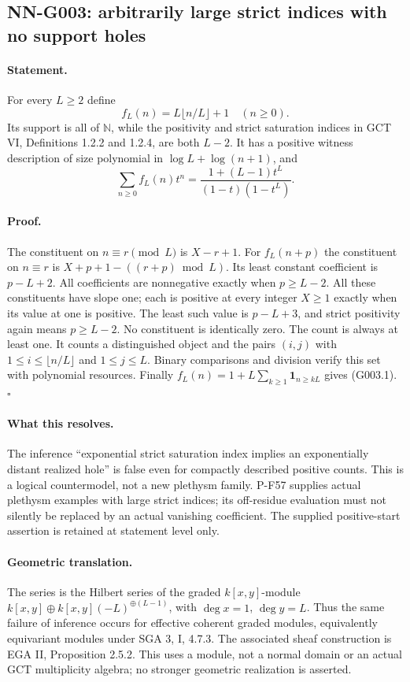 \subsection{NN-G003: arbitrarily large strict indices with no support holes}
\paragraph{Statement.}
For every $L\ge2$ define
\[
 f_L(n)=L\lfloor n/L\rfloor+1\quad(n\ge0).
\]
Its support is all of $\mathbb N$, while the positivity and strict
saturation indices in GCT VI, Definitions 1.2.2 and 1.2.4, are both
$L-2$. It has a positive witness description of size polynomial in
$\log L+\log(n+1)$, and
\[
 \sum_{n\ge0}f_L(n)t^n=
 \frac{1+(L-1)t^L}{(1-t)(1-t^L)}.
 \tag{G003.1}
\]

\paragraph{Proof.}
The constituent on $n\equiv r\pmod L$ is $X-r+1$.
For $f_L(n+p)$ the constituent on $n\equiv r$ is
$X+p+1-((r+p)\bmod L)$. Its least constant coefficient is
$p-L+2$. All coefficients are nonnegative exactly when $p\ge L-2$.
All these constituents have slope one; each is positive at every
integer $X\ge1$ exactly when its value at one is positive. The least
such value is $p-L+3$, and strict positivity again means
$p\ge L-2$. No constituent is identically zero. The count is always
at least one. It counts a distinguished object and the pairs
$(i,j)$ with $1\le i\le\lfloor n/L\rfloor$ and $1\le j\le L$.
Binary comparisons and division verify this set with polynomial
resources. Finally
$f_L(n)=1+L\sum_{k\ge1}\mathbf1_{n\ge kL}$ gives (G003.1).
\hfill$\square$

\paragraph{What this resolves.}
The inference ``exponential strict saturation index implies an
exponentially distant realized hole'' is false even for compactly
described positive counts. This is a logical countermodel, not a
new plethysm family. P-F57 supplies actual plethysm examples with
large strict indices; its off-residue evaluation must not silently
be replaced by an actual vanishing coefficient. The supplied
positive-start assertion is retained at statement level only.

\paragraph{Geometric translation.}
The series is the Hilbert series of the graded
$k[x,y]$-module
$k[x,y]\oplus k[x,y](-L)^{\oplus(L-1)}$, with
$\deg x=1$, $\deg y=L$. Thus the same failure of inference occurs
for effective coherent graded modules, equivalently equivariant
modules under SGA 3, I, 4.7.3. The associated sheaf construction is
EGA II, Proposition 2.5.2. This uses a module, not a normal domain
or an actual GCT multiplicity algebra; no stronger geometric
realization is asserted.

